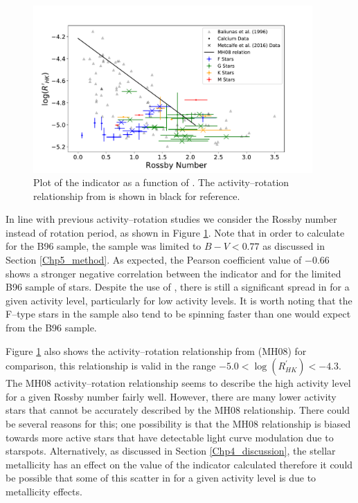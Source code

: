 \begin{figure}
    \centering
    \includegraphics[width=0.95\textwidth]{Figures/5-Activity_rotation/rhk_v_r0.pdf}
    \caption[\Rprime indicator as a function of \Ro]{Plot of the \Rprime indicator as a function of \Ro. The activity--rotation relationship from \citet{Mamajek_Hillenbrand_2008} is shown in black for reference.}
    \label{fig:rhk_v_ro}
\end{figure}

In line with previous activity--rotation studies \citep{Mamajek_Hillenbrand_2008,Metcalfe_etal_2016} we consider the Rossby number instead of rotation period, as shown in Figure \ref{fig:rhk_v_ro}. Note that in order to calculate \Ro for the B96 sample, the sample was limited to $B-V < 0.77$ as discussed in Section \ref{Chp5_method}. As expected, the Pearson coefficient value of $-0.66$ shows a stronger negative correlation between the \Rprime indicator and \Ro for the limited B96 sample of stars. Despite the use of \Ro, there is still a significant spread in \Ro for a given activity level, particularly for low activity levels. It is worth noting that the F--type stars in the sample also tend to be spinning faster than one would expect from the B96 sample.

Figure \ref{fig:rhk_v_ro} also shows the activity--rotation relationship from \citet{Mamajek_Hillenbrand_2008} (MH08) for comparison, this relationship is valid in the range $-5.0 < \log(R^{'}_{HK}) < -4.3$. The MH08 activity--rotation relationship seems to describe the high activity level for a given Rossby number fairly well. However, there are many lower activity stars that cannot be accurately described by the MH08 relationship. There could be several reasons for this; one possibility is that the MH08 relationship is biased towards more active stars that have detectable light curve modulation due to starspots. Alternatively, as discussed in Section \ref{Chp4_discussion}, the stellar metallicity has an effect on the value of the \Rprime indicator calculated therefore it could be possible that some of this scatter in \Ro for a given activity level is due to metallicity effects.


